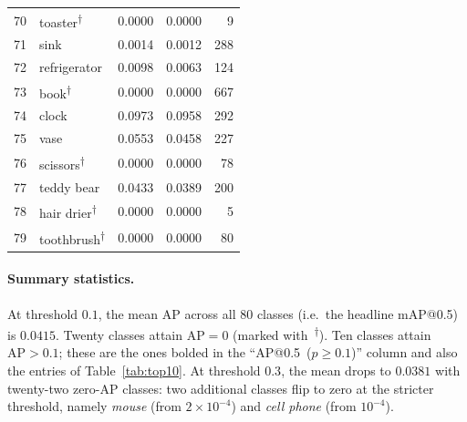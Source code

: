 \begin{longtable}{rlrrr}
70 & toaster\textsuperscript{$\dagger$}         & 0.0000 & 0.0000 &      9 \\
71 & sink            & 0.0014 & 0.0012 &    288 \\
72 & refrigerator    & 0.0098 & 0.0063 &    124 \\
73 & book\textsuperscript{$\dagger$}            & 0.0000 & 0.0000 &    667 \\
74 & clock           & 0.0973 & 0.0958 &    292 \\
75 & vase            & 0.0553 & 0.0458 &    227 \\
76 & scissors\textsuperscript{$\dagger$}        & 0.0000 & 0.0000 &     78 \\
77 & teddy bear      & 0.0433 & 0.0389 &    200 \\
78 & hair drier\textsuperscript{$\dagger$}      & 0.0000 & 0.0000 &      5 \\
79 & toothbrush\textsuperscript{$\dagger$}      & 0.0000 & 0.0000 &     80 \\
\end{longtable}

\paragraph{Summary statistics.} At threshold $0.1$, the mean AP across all
80 classes (i.e.\ the headline mAP@0.5) is $0.0415$. Twenty classes attain
$\mathrm{AP}=0$ (marked with~\textsuperscript{$\dagger$}). Ten classes
attain $\mathrm{AP}>0.1$; these are the ones bolded in the
``AP@0.5~($p\!\ge\!0.1$)'' column and also the entries of
Table~\ref{tab:top10}. At threshold $0.3$, the mean drops to $0.0381$ with
twenty-two zero-AP classes: two additional classes flip to zero at the
stricter threshold, namely \emph{mouse} (from $2\!\times\!10^{-4}$) and
\emph{cell phone} (from $10^{-4}$).
